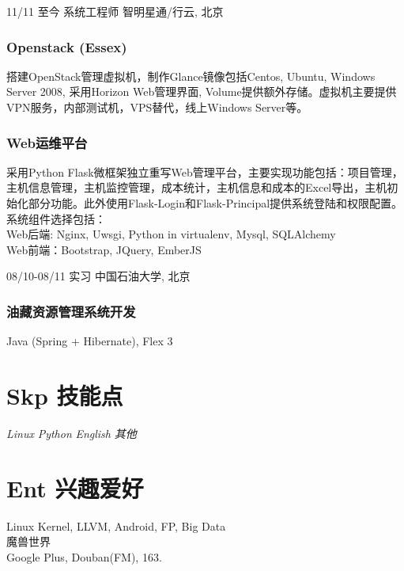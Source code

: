\documentclass[]{friggeri-cv}
\begin{document}
\begin{entrylist}
  \entry
    {\small 11/11 至今}
    {系统工程师}
    {智明星通/行云, 北京}
    {
    \subsubsection*{\small Openstack (Essex)}
      \indent 搭建OpenStack管理虚拟机，制作Glance镜像包括Centos, Ubuntu, Windows Server 2008, 采用Horizon Web管理界面, Volume提供额外存储。虚拟机主要提供VPN服务，内部测试机，VPS替代，线上Windows Server等。
      \subsubsection*{\small Web运维平台}
      \indent 采用Python Flask微框架独立重写Web管理平台，主要实现功能包括：项目管理，主机信息管理，主机监控管理，成本统计，主机信息和成本的Excel导出，主机初始化部分功能。此外使用Flask-Login和Flask-Principal提供系统登陆和权限配置。\\
      系统组件选择包括：\\
      Web后端: Nginx, Uwsgi, Python in virtualenv, Mysql, SQLAlchemy\\
      Web前端：Bootstrap, JQuery, EmberJS}
    
  \entry
    {\small 08/10-08/11}
    {实习}
    {中国石油大学, 北京}
   { \subsubsection*{油藏资源管理系统开发}
      Java (Spring + Hibernate), Flex 3
    }
\end{entrylist}

\section{Skp 技能点}
\begin{entrylist}
  \entry
    {\emph{Linux}}{}{}
    {}
  \entry
    {\emph{Python}}{}{}
    {}
  \entry
    {\emph{English}}{}{}
    {}
  \entry
    {\emph{其他}}{}{}
    {}
\end{entrylist}

\section{Ent 兴趣爱好}
  Linux Kernel, LLVM, Android, FP, Big Data\\
  魔兽世界\\
  Google Plus, Douban(FM), 163. 
\end{document}
